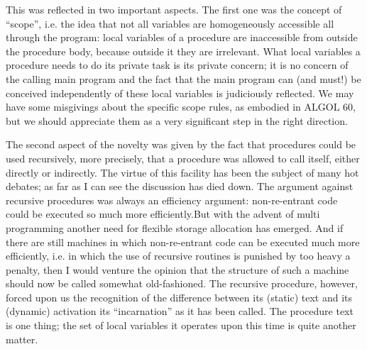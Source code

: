 This was reflected in two important aspects. The first one was the concept of ``scope'', i.e. the idea that not all variables are homogeneously accessible all through the program: local variables of a procedure are inaccessible from  outside the procedure body, because outside it they are irrelevant. What local variables a procedure needs to do its private task is its private concern; it is no concern of the calling main program and the fact that the main program can (and must!) be conceived independently of these local variables is judiciously reflected. We may have some misgivings about the specific scope rules, as embodied in ALGOL 60, but we should appreciate them as a very significant step in the right direction.

The second aspect of the novelty was given by the fact that procedures could be used recursively, more precisely, that a procedure was allowed to call itself, either directly or indirectly. The virtue of this facility has been the subject of many hot debates; as far as I can see the discussion has died down. The argument against recursive procedures was always an efficiency argument: non-re-entrant code could be executed so much more efficiently.But with the advent of multi programming another need for flexible storage allocation has emerged. And if there are still machines in which non-re-entrant code can be executed much more efficiently, i.e. in which the use of recursive routines is punished by too heavy a penalty, then I would venture the opinion that the structure of such a machine should now be called somewhat old-fashioned. The recursive procedure, however, forced upon us the recognition of the difference between its (static) text and its (dynamic) activation \textemdash{}  its ``incarnation'' as it has been called. The procedure text is one thing; the set of local variables it operates upon this time is quite another matter.

